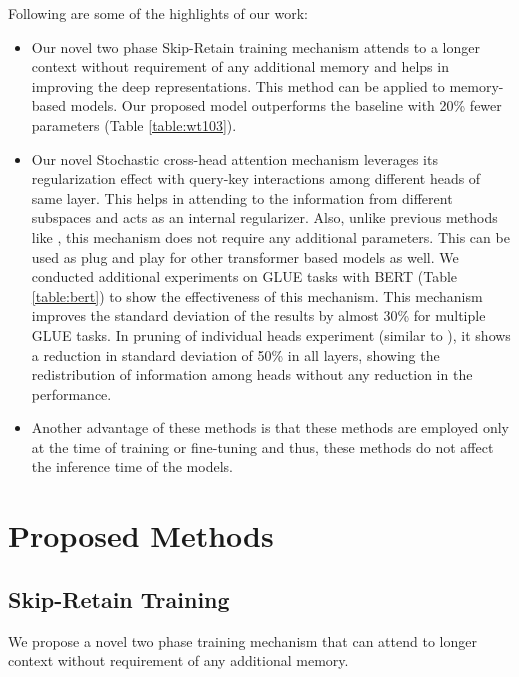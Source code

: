 \documentclass[11pt]{article}
\begin{document}
Following are some of the highlights of our work:

\begin{itemize}
    \item Our novel two phase Skip-Retain training mechanism attends to a longer context without requirement of any additional memory and helps in improving the deep representations. This method can be applied to memory-based models. Our proposed model outperforms the baseline with 20\% fewer parameters (Table \ref{table:wt103}).
    \item  Our novel Stochastic cross-head attention mechanism leverages its regularization effect with query-key interactions among different heads of same layer. This helps in attending to the information from different subspaces and acts as  an internal regularizer. Also, unlike previous methods like \citep{DBLP:journals/corr/abs-2003-02436}, this mechanism  does not require any additional parameters. This can be used as plug and play for other transformer based models as well. We conducted additional experiments on GLUE tasks \citep{DBLP:conf/iclr/WangSMHLB19} with BERT \citep{DBLP:conf/naacl/DevlinCLT19} (Table \ref{table:bert}) to show the effectiveness of this mechanism. This mechanism improves the standard deviation of the results by almost 30\% for multiple GLUE tasks. In pruning of individual heads experiment (similar to \citet{DBLP:conf/nips/MichelLN19}), it shows a reduction in standard deviation of 50\% in all layers, showing the redistribution of information among heads without any reduction in the performance.
    \item Another advantage of these methods is that these methods are employed only at the time of training or fine-tuning and thus, these methods do not affect the inference time of the models.
\end{itemize}



\section{Proposed Methods}


\subsection{Skip-Retain Training}

We propose a novel two phase training mechanism that can attend to longer context without requirement of any additional memory.
\end{document}
